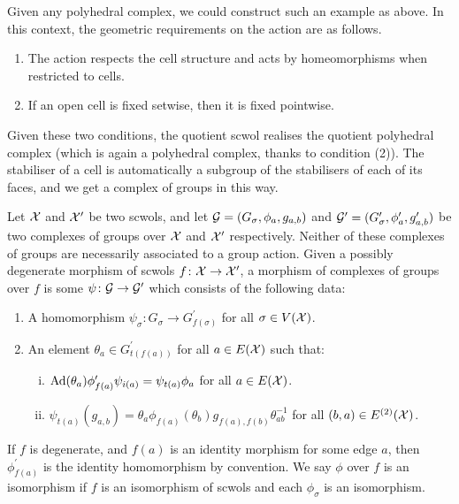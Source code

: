 Given any polyhedral complex, we could construct such an example as above.
In this context, the geometric requirements on the action are as follows.
\begin{enumerate}
	\item The action respects the cell structure and acts by homeomorphisms when restricted to cells.
	\item If an open cell is fixed setwise, then it is fixed pointwise.
\end{enumerate}
Given these two conditions, the quotient scwol realises the quotient polyhedral complex (which is again a polyhedral complex, thanks to condition (2)).
The stabiliser of a cell is automatically a subgroup of the stabilisers of each of its faces, and we get a complex of groups in this way.

\begin{definition}
	Let $\mathcal{X}$ and $\mathcal{X}^\prime$ be two scwols, and let $\mathcal{G} = (G_\sigma, \phi_a, g_{a,b})$ and  $\mathcal{G}^\prime = (G^\prime_\sigma, \phi^\prime_a, g^\prime_{a,b})$ be two complexes of groups over $\mathcal{X}$ and $\mathcal{X}^\prime$ respectively.
	Neither of these complexes of groups are necessarily associated to a group action.
	Given a possibly degenerate morphism of scwols $f \colon \mathcal{X} \to \mathcal{X}^\prime$, a morphism of complexes of groups over $f$ is some $\psi  \colon \mathcal{G} \to \mathcal{G}^\prime$ which consists of the following data:
	\begin{enumerate}
		\item A homomorphism $\psi_\sigma \colon G_\sigma \to G^\prime_{f(\sigma)}$ for all $\sigma \in V(\mathcal{X}) $.
		\item An element $\theta_a \in G^\prime_{t(f(a))}$ for all $a \in E(\mathcal{X})$ such that:
		      \begin{enumerate}[(i)]
			      \item $\operatorname{Ad}(\theta_a)\phi'_{f(a)}\psi_{i(a)}=\psi_{t(a)}\phi_a$ for all $a \in E(\mathcal{X})$.
			      \item $\psi_{t(a)}(g_{a,b}) = \theta_a\phi_{f(a)}(\theta_b)g_{f(a),f(b)}\theta_{ab}^{-1}$ for all $(b,a) \in E^{(2)}(\mathcal{X})$.
		      \end{enumerate}
	\end{enumerate}
	If  $f$ is degenerate, and  $f(a)$ is an identity morphism for some edge $a$, then $\phi^\prime_{f(a)}$ is the identity homomorphism by convention.
	We say $\phi$ over $f$ is an isomorphism if $f$ is an isomorphism of scwols and each $\phi_\sigma$ is an isomorphism.
	\label{def:morhpism_of_complexes_of_groups}
\end{definition}

